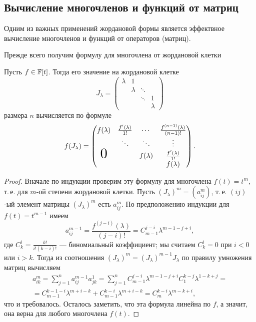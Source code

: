 \subsection{Вычисление многочленов и функций от матриц}

Одним из важных применений жордановой формы является эффектвное вычисление многочленов и функций от операторов (матриц).

Прежде всего получим формулу для многочлена от жордановой клетки

\begin{proposal}
    Пусть $f \in \mathbb{F}[t]$. Тогда его значение на жордановой клетке
    \[
        J_\lambda =
        \begin{pmatrix}
            \lambda & 1 & & \\
            & \lambda & \ddots & \\
            & & \ddots & 1 \\
            & & & \lambda
        \end{pmatrix}
    \]
    размера $n$ вычисляется по формуле
    \[
        f(J_\lambda) =
        \begin{pmatrix}
            f(\lambda) & \frac{f^\prime(\lambda)}{1!} & \cdots & \frac{f^{(n - 1)}(\lambda)}{(n - 1)!}\\
            & \ddots & \ddots & \vdots\\
            \scalebox{2}{$0$} & & f(\lambda) & \frac{f^\prime(\lambda)}{1!}\\
            & & & f(\lambda)
        \end{pmatrix}.
    \]
\end{proposal}

\begin{proof}
    Вначале по индукции проверим эту формулу для многочлена $f(t) = t^m$, т.\,е. для $m$-ой степени жордановой клетки. Пусть $(J_\lambda)^m = (a_{ij}^m)$, т.\,е. $(ij)$-ый элемент матрицы $(J_\lambda)^m$ есть $a_{ij}^m$. По предположению индукции для $f(t) = t^{m - 1}$ имеем
    \[
        a_{ij}^{m - 1} = \frac{f^{(j - i)}(\lambda)}{(j - i)!} = C_{m - 1}^{j - i}\lambda^{m - 1 - j + i},
    \]
    где $C_k^i = \frac{k!}{i!(k - i)!}$ --- биномиальный коэффициент; мы считаем $C_k^i = 0$ при $i < 0$ или $i > k$. Тогда из соотношения $(J_\lambda)^m = (J_\lambda)^{m - 1}J_\lambda$ по правилу умножения матриц вычисляем
    \begin{multline*}
        a_{ik}^m = \sum_{j = 1}^na_{ij}^{m - 1}a_{jk}^1 = \sum_{j = 1}^nC_{m - 1}^{j - i}\lambda^{m - 1 - j + i}C_1^{k - j}\lambda^{1 - k + j} =\\ =C_{m - 1}^{k - 1 - i}\lambda^{m + i - k} + C_{m - 1}^{k - i}\lambda^{m + i - k} = C_m^{k - i}\lambda^{m - k + i},
    \end{multline*}
    что и требовалось. Осталось заметить, что эта формула линейна по $f$, а значит, она верна для любого многочлена $f(t)$.
\end{proof}

